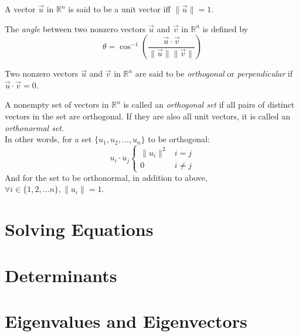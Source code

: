 \documentclass{report}
\begin{document}
		\begin{defn}
			A vector $\vec{u}$ in $\mathbb{R}^n$ is said to be a unit vector iff $\|\vec{u}\|=1$.
		\end{defn}
		
		\begin{defn}[Angle]
			The \emph{angle} between two nonzero vectors $\vec{u}$ and $\vec{v}$ in $\mathbb{R}^n$ is defined by
			\begin{displaymath}
				\theta=\cos^{-1}(\frac{\vec{u}\cdot\vec{v}}{\|\vec{u}\|\|\vec{v}\|})
			\end{displaymath}
		\end{defn}
		
		\begin{defn}
			Two nonzero vectors $\vec{u}$ and $\vec{v}$ in $\mathbb{R}^n$ are said to be \emph{orthogonal} or \emph{perpendicular} if $\vec{u} \cdot \vec{v} = 0$.
		\end{defn}
		
		\begin{defn}
			A nonempty set of vectors in $\mathbb{R}^n$ is called an \emph{orthogonal set} if all pairs of distinct vectors in the set are orthogonal. If they are also all unit vectors, it is called an \emph{orthonormal set}.\\
			In other words, for a set $\{u_1, u_2, \dots, u_n\}$ to be orthogonal:
			\begin{displaymath}
				u_i \cdot u_j
				\begin{cases}
					\|u_i\|^2 & i=j\\
					0 & i \ne j
				\end{cases}
			\end{displaymath}
			And for the set to be orthonormal, in addition to above, $\forall i \in \{1, 2, \dots n\}, \|u_i\|=1$.
		\end{defn}
		
	\section{Solving Equations}
		\subsection{}
	\section{Determinants}
		\subsection{}
	\section{Eigenvalues and Eigenvectors}
		\subsection{}
\end{document}
